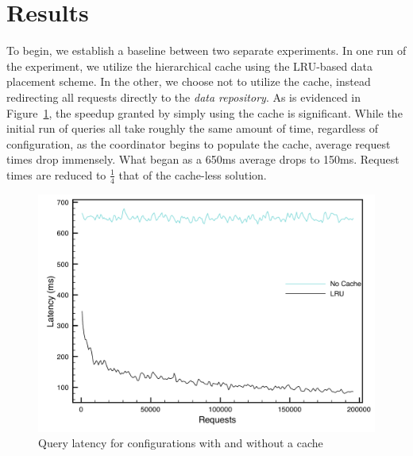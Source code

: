 
\section{Results} %
\label{sec:results_storage}
To begin, we establish a baseline between two separate experiments. In one run
of the experiment, we utilize the hierarchical cache using the LRU-based data
placement scheme. In the other, we choose not to utilize the cache, instead
redirecting all requests directly to the \emph{data repository}. As is
evidenced in Figure~\ref{fig:hierarchy-latency-nocache}, the speedup granted by
simply using the cache is significant. While the initial run of queries all
take roughly the same amount of time, regardless of configuration, as the
coordinator begins to populate the cache, average request times drop immensely.
What began as a 650ms average drops to 150ms. Request times are reduced to
$\frac{1}{4}$ that of the cache-less solution.

\begin{figure}
\begin{center}
\includegraphics[scale=0.5]{figures/hierarchy-latency-nocache.pdf}
\end{center}
\caption{Query latency for configurations with and without a cache}
\label{fig:hierarchy-latency-nocache}
\end{figure}

